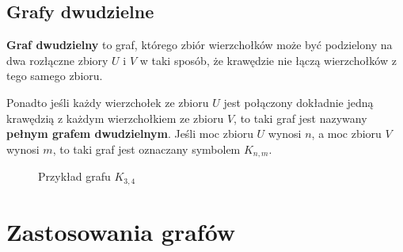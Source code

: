 \subsection*{Grafy dwudzielne}

\textbf{Graf dwudzielny} to graf, którego zbiór wierzchołków może być podzielony na dwa rozłączne zbiory $U$ i $V$ w taki sposób, że krawędzie nie łączą wierzchołków z tego samego zbioru. 

Ponadto jeśli każdy wierzchołek ze zbioru $U$ jest połączony dokładnie jedną krawędzią z każdym wierzchołkiem ze zbioru $V$, to taki graf jest nazywany \textbf{pełnym grafem dwudzielnym}. Jeśli moc zbioru $U$ wynosi $n$, a moc zbioru $V$ wynosi $m$, to taki graf jest oznaczany symbolem $K_{n,m}$.

\begin{figure}[h]
\centering
{}
\captionsetup{justification=centering}
\caption{Przykład grafu $K_{3,4}$} \label{fig:k-3-4-graph-example}
\end{figure}

\section{Zastosowania grafów}